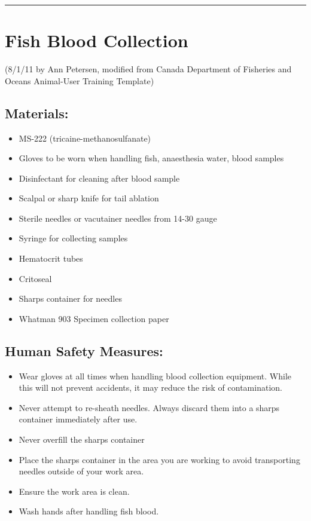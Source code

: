 \documentclass[
]{book}
\providecommand{\tightlist}{%
  \setlength{\itemsep}{0pt}\setlength{\parskip}{0pt}}
\begin{document}
\begin{center}\rule{0.5\linewidth}{0.5pt}\end{center}

\hypertarget{fish-blood-collection}{%
\section{Fish Blood Collection}\label{fish-blood-collection}}

(8/1/11 by Ann Petersen, modified from Canada Department of Fisheries and Oceans Animal-User Training Template)

\hypertarget{materials-11}{%
\subsection{Materials:}\label{materials-11}}

\begin{itemize}
\tightlist
\item
  MS-222 (tricaine-methanosulfanate)
\item
  Gloves to be worn when handling fish, anaesthesia water, blood samples
\item
  Disinfectant for cleaning after blood sample
\item
  Scalpal or sharp knife for tail ablation
\item
  Sterile needles or vacutainer needles from 14-30 gauge
\item
  Syringe for collecting samples
\item
  Hematocrit tubes
\item
  Critoseal
\item
  Sharps container for needles
\item
  Whatman 903 Specimen collection paper
\end{itemize}

\hypertarget{human-safety-measures}{%
\subsection{Human Safety Measures:}\label{human-safety-measures}}

\begin{itemize}
\tightlist
\item
  Wear gloves at all times when handling blood collection equipment. While this will not prevent accidents, it may reduce the risk of contamination.
\item
  Never attempt to re-sheath needles. Always discard them into a sharps container immediately after use.
\item
  Never overfill the sharps container
\item
  Place the sharps container in the area you are working to avoid transporting needles outside of your work area.
\item
  Ensure the work area is clean.
\item
  Wash hands after handling fish blood.
\end{itemize}
\end{document}
